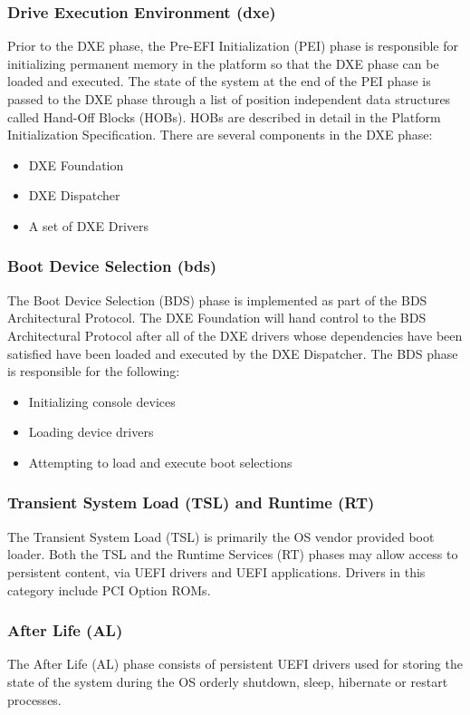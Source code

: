 \subsubsection{Drive Execution Environment (\gls{dxe})}
Prior to the DXE phase, the Pre-EFI Initialization (PEI) phase is responsible for initializing permanent memory in the platform so that the DXE phase can be loaded and executed. The state of the system at the end of the PEI phase is passed to the DXE phase through a list of position independent data structures called Hand-Off Blocks (HOBs). HOBs are described in detail in the Platform Initialization Specification.
There are several components in the DXE phase:
\begin{itemize}
	\item DXE Foundation
	\item DXE Dispatcher
	\item A set of DXE Drivers
\end{itemize}

\subsubsection{Boot Device Selection (\gls{bds})}
The Boot Device Selection (BDS) phase is implemented as part of the BDS Architectural Protocol. The DXE Foundation will hand control to the BDS Architectural Protocol after all of the DXE drivers whose dependencies have been satisfied have been loaded and executed by the DXE Dispatcher. The BDS phase is responsible for the following:
\begin{itemize}
	\item Initializing console devices
	\item Loading device drivers
	\item Attempting to load and execute boot selections
\end{itemize}

\subsubsection{Transient System Load (TSL) and Runtime (RT)}
The Transient System Load (TSL) is primarily the OS vendor provided boot loader. Both the TSL and the Runtime Services (RT) phases may allow access to persistent content, via UEFI drivers and UEFI applications. Drivers in this category include PCI Option ROMs.

\subsubsection{After Life (AL)}
The After Life (AL) phase consists of persistent UEFI drivers used for storing the state of the system during the OS orderly shutdown, sleep, hibernate or restart processes.
